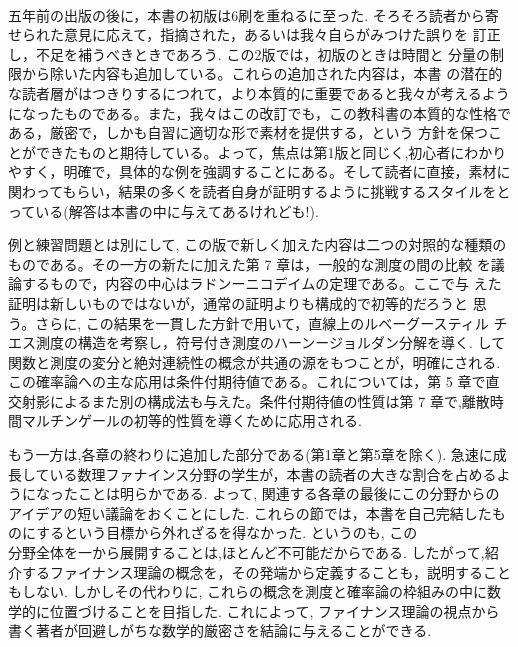 \documentclass[14pt]{jsarticle}
\begin{document}
 \ 
\bigskip

\begin{flushright}
\LARGE{}
\end{flushright}

\bigskip
\bigskip
\bigskip

五年前の出版の後に，本書の初版は6刷を重ねるに至った. そろそろ読者から寄せられた意見に応えて，指摘された，あるいは我々自らがみつけた誤りを 訂正し，不足を補うべきときであろう. この2版では，初版のときは時間と 分量の制限から除いた内容も追加している。これらの追加された内容は，本書 の潜在的な読者層がはつきりするにつれて，より本質的に重要であると我々が考えるようになったものである。また，我々はこの改訂でも，この教科書の本質的な性格である，厳密で，しかも自習に適切な形で素材を提供する，という 方針を保つことができたものと期待している。よって，焦点は第1版と同じく,初心者にわかりやすく，明確で，具体的な例を強調することにある。そして読者に直接，素材に関わってもらい，結果の多くを読者自身が証明するように挑戦するスタイルをとっている(解答は本書の中に与えてあるけれども!).

例と練習問題とは別にして, この版で新しく加えた内容は二つの対照的な種類のものである。その一方の新たに加えた第 7 章は，一般的な測度の間の比較 を議論するもので，内容の中心はラドンーニコデイムの定理である。ここで与 えた証明は新しいものではないが，通常の証明よりも構成的で初等的だろうと 思う。さらに, この結果を一貫した方針で用いて，直線上のルベーグースティル チエス測度の構造を考察し，符号付き測度のハーンージョルダン分解を導く. して関数と測度の変分と絶対連続性の概念が共通の源をもつことが，明確にされる. この確率論への主な応用は条件付期待値である。これについては，第 5 章で直交射影によるまた別の構成法も与えた。条件付期待値の性質は第 7 章で,離散時間マルチンゲールの初等的性質を導くために応用される.

もう一方は,各章の終わりに追加した部分である(第1章と第5章を除く). 急速に成長している数理ファナインス分野の学生が，本書の読者の大きな割合を占めるようになったことは明らかである. よって, 関連する各章の最後にこの分野からのアイデアの短い議論をおくことにした. これらの節では，本書を自己完結したものにするという目標から外れざるを得なかった. というのも, この\\
分野全体を一から展開することは,ほとんど不可能だからである. したがって,紹介するファイナンス理論の概念を，その発端から定義することも，説明することもしない. しかしその代わりに, これらの概念を測度と確率論の枠組みの中に数学的に位置づけることを目指した. これによって, ファイナンス理論の視点から書く著者が回避しがちな数学的厳密さを結論に与えることができる.
\end{document}

